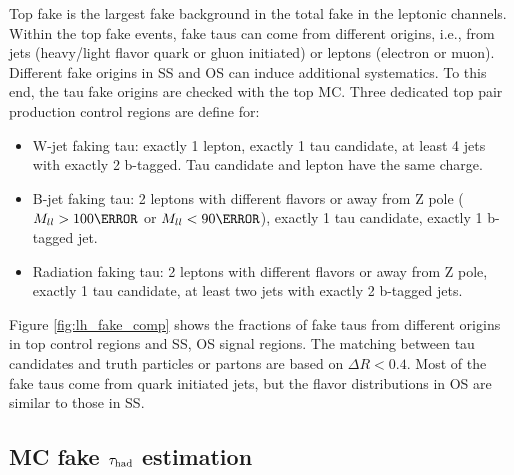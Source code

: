 Top fake is the largest fake background in the total fake in the leptonic channels. 
Within the top fake events, fake taus can come from different origins, i.e., from jets (heavy/light flavor quark or gluon initiated) 
or leptons (electron or muon). Different fake origins in SS and OS can induce additional systematics. To this end, the tau fake 
origins are checked with the top MC. Three dedicated top pair production control regions are define for:
\begin{itemize}
\item{W-jet faking tau: exactly 1 lepton, exactly 1 tau candidate, at least 4 jets with exactly 2 b-tagged. Tau candidate and lepton have the same charge.}
\item{B-jet faking tau: 2 leptons with different flavors or away from Z pole ($M_{ll}>100\GeV$ or $M_{ll}<90\GeV$), exactly 1 tau candidate, exactly 1 b-tagged jet.}
\item{Radiation faking tau: 2 leptons with different flavors or away from Z pole, exactly 1 tau candidate, at least two jets with exactly 2 b-tagged jets.}
\end{itemize}
Figure \ref{fig:lh_fake_comp} shows the fractions of fake taus from different 
origins in top control regions and SS, OS signal regions. The matching between tau candidates and truth particles or partons are based on $\Delta R<0.4$. 
Most of the fake taus come from quark initiated jets, but the flavor distributions in OS are similar to those in SS. 



%

\subsection{MC fake $\tau_\text{had}$ estimation}
\label{sec:sf_method}

